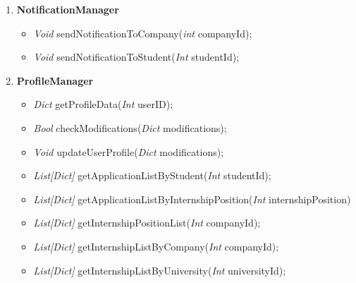 \begin{enumerate}
    \item \textbf{NotificationManager}
    \begin{itemize}
        \item \textit{Void} sendNotificationToCompany(\textit{int} companyId);          %
        \item \textit{Void} sendNotificationToStudent(\textit{Int} studentId);          %
    \end{itemize}

    \item \textbf{ProfileManager}
    \begin{itemize}
        \item \textit{Dict} getProfileData(\textit{Int} userID);                            %
        \item \textit{Bool} checkModifications(\textit{Dict} modifications);                %
        \item \textit{Void} updateUserProfile(\textit{Dict} modifications);                 %
        \item \textit{List[Dict]} getApplicationListByStudent(\textit{Int} studentId);      %
        \item \textit{List[Dict]} getApplicationListByInternshipPosition(\textit{Int} internshipPosition)   %
        \item \textit{List[Dict]} getInternshipPositionList(\textit{Int} companyId);        %
        \item \textit{List[Dict]} getInternshipListByCompany(\textit{Int} companyId);       %
        \item \textit{List[Dict]} getInternshipListByUniversity(\textit{Int} universityId); %
    \end{itemize}


\end{enumerate}
